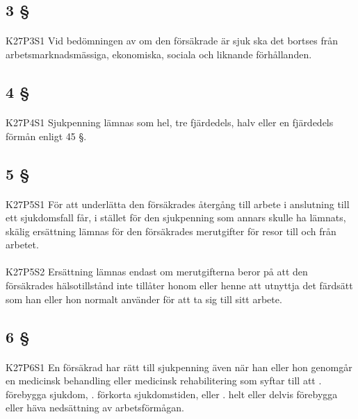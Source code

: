 \documentclass[a4paper,notitlepage,openany,10pt]{book}
\begin{document}
\subsection*{3 §}
\paragraph*{}
{\tiny K27P3S1}
Vid bedömningen av om den försäkrade är sjuk ska det bortses från arbetsmarknadsmässiga, ekonomiska, sociala och liknande förhållanden.
\subsection*{4 §}
\paragraph*{}
{\tiny K27P4S1}
Sjukpenning lämnas som hel, tre fjärdedels, halv eller en fjärdedels förmån enligt 45 §.
\subsection*{5 §}
\paragraph*{}
{\tiny K27P5S1}
För att underlätta den försäkrades återgång till arbete i anslutning till ett sjukdomsfall får, i stället för den sjukpenning som annars skulle ha lämnats, skälig ersättning lämnas för den försäkrades merutgifter för resor till och från arbetet.
\paragraph*{}
{\tiny K27P5S2}
Ersättning lämnas endast om merutgifterna beror på att den försäkrades hälsotillstånd inte tillåter honom eller henne att utnyttja det färdsätt som han eller hon normalt använder för att ta sig till sitt arbete.
\subsection*{6 §}
\paragraph*{}
{\tiny K27P6S1}
En försäkrad har rätt till sjukpenning även när han eller hon genomgår en medicinsk behandling eller medicinsk rehabilitering som syftar till att
. förebygga sjukdom,
. förkorta sjukdomstiden, eller
. helt eller delvis förebygga eller häva nedsättning av arbetsförmågan.
\end{document}

